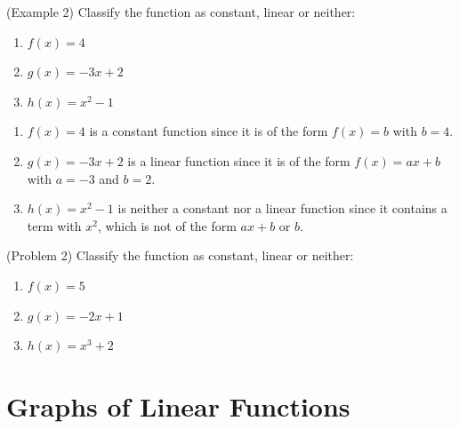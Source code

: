 \documentclass[handout]{ximera}
\begin{document}
\begin{example}(Example 2)
Classify the function as constant, linear or neither:
\begin{enumerate}
\item $f(x) = 4$ 
\item $g(x) = -3x + 2$ 
\item $h(x) = x^2 - 1$    
\end{enumerate} 
\begin{solution}
\begin{enumerate}
\item $f(x) = 4$ is a constant function since it is of the form $f(x) = b$ with $b = 4$.
\item $g(x) = -3x + 2$ is a linear function since it is of the form $f(x) = ax + b$ with $a = -3$ and $b = 2$.
\item $h(x) = x^2 - 1$ is neither a constant nor a linear function since it contains a term with $x^2$, which is not of the form $ax + b$ or $b$.    
\end{enumerate}
\end{solution}     
\end{example}

\begin{problem}(Problem 2)
Classify the function as constant, linear or neither:
\begin{enumerate}
\item $f(x) = 5$ 
\item $g(x) = -2x + 1$ 
\item $h(x) = x^3 + 2$     
\end{enumerate}    
\end{problem}


\section{Graphs of Linear Functions}
\end{document}
